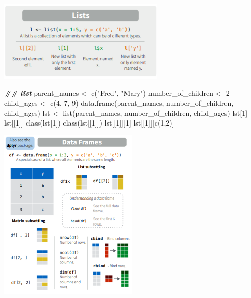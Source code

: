 \documentclass[
]{book}
\newenvironment{Shaded}{\begin{snugshade}}{\end{snugshade}}
\newcommand{\DecValTok}[1]{\textcolor[rgb]{0.00,0.00,0.81}{#1}}
\newcommand{\DocumentationTok}[1]{\textcolor[rgb]{0.56,0.35,0.01}{\textbf{\textit{#1}}}}
\newcommand{\FunctionTok}[1]{\textcolor[rgb]{0.00,0.00,0.00}{#1}}
\newcommand{\NormalTok}[1]{#1}
\newcommand{\OtherTok}[1]{\textcolor[rgb]{0.56,0.35,0.01}{#1}}
\newcommand{\StringTok}[1]{\textcolor[rgb]{0.31,0.60,0.02}{#1}}
\begin{document}
\includegraphics[width=3.125in,height=\textheight]{images/03/05.PNG}

\begin{Shaded}
\begin{Highlighting}[]
\DocumentationTok{\#\# list}
\NormalTok{parent\_names }\OtherTok{\textless{}{-}} \FunctionTok{c}\NormalTok{(}\StringTok{"Fred"}\NormalTok{, }\StringTok{"Mary"}\NormalTok{)}
\NormalTok{number\_of\_children }\OtherTok{\textless{}{-}} \DecValTok{2}
\NormalTok{child\_ages }\OtherTok{\textless{}{-}} \FunctionTok{c}\NormalTok{(}\DecValTok{4}\NormalTok{, }\DecValTok{7}\NormalTok{, }\DecValTok{9}\NormalTok{)}
\FunctionTok{data.frame}\NormalTok{(parent\_names, number\_of\_children, child\_ages)}
\NormalTok{lst }\OtherTok{\textless{}{-}} \FunctionTok{list}\NormalTok{(parent\_names, number\_of\_children, child\_ages)}
\NormalTok{lst[}\DecValTok{1}\NormalTok{]}
\NormalTok{lst[[}\DecValTok{1}\NormalTok{]]}
\FunctionTok{class}\NormalTok{(lst[}\DecValTok{1}\NormalTok{])}
\FunctionTok{class}\NormalTok{(lst[[}\DecValTok{1}\NormalTok{]])}
\NormalTok{lst[[}\DecValTok{1}\NormalTok{]][}\DecValTok{1}\NormalTok{]}
\NormalTok{lst[[}\DecValTok{1}\NormalTok{]][}\FunctionTok{c}\NormalTok{(}\DecValTok{1}\NormalTok{,}\DecValTok{2}\NormalTok{)]}
\end{Highlighting}
\end{Shaded}

\includegraphics[width=2.60417in,height=\textheight]{images/03/06.PNG}
\end{document}
